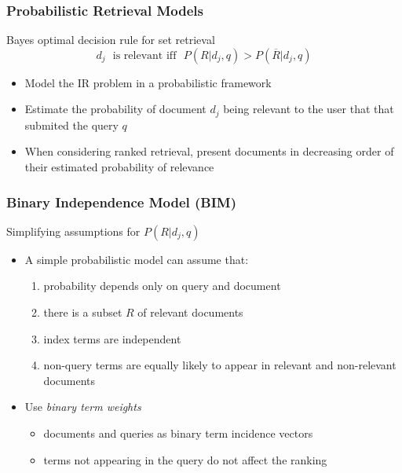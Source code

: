 \documentclass[svgnames]{beamer}
\begin{document}
\begin{frame}  \frametitle{Probabilistic Retrieval Models}
    \begin{block}{Bayes optimal decision rule for set retrieval}
      \begin{displaymath}
          d_j \text{~~is relevant iff~~} P(R|d_j,q) > P(\overline{R}|d_j,q)
      \end{displaymath}
    \end{block}
    \begin{itemize}
    \item Model the IR problem in a probabilistic framework
    \item Estimate the probability of document $d_j$ being relevant to the user that that submited the query $q$
    \item When considering ranked retrieval, present documents in decreasing order of their estimated probability of relevance
    \end{itemize}
\end{frame}

\begin{frame}  \frametitle{Binary Independence Model (BIM)}
  \begin{block}{Simplifying assumptions for $P(R|d_j,q)$}
    \begin{itemize}
    \item A simple probabilistic model can assume that:
      \begin{enumerate}
      \item probability depends only on query and document
      \item there is a subset $R$ of relevant documents
      \item index terms are independent
      \item non-query terms are equally likely to appear in relevant and non-relevant documents
      \end{enumerate}
    \item Use \emph{binary term weights}
      \begin{itemize}
      \item documents and queries as binary term incidence vectors
      \item terms not appearing in the query do not affect the ranking
      \end{itemize}
    \end{itemize}
  \end{block}

\end{frame}
\end{document}
